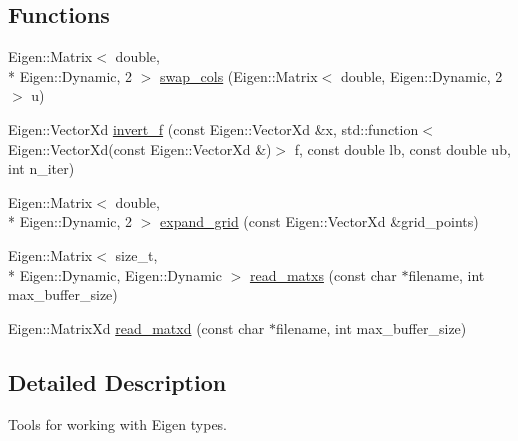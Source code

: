 \subsection*{Functions}
\begin{DoxyCompactItemize}
\item 
Eigen\+::\+Matrix$<$ double, \\*
Eigen\+::\+Dynamic, 2 $>$ \hyperlink{namespacevinecopulib_1_1tools__eigen_a87f5c90d47fb6baffc84ad28a82d8f0e}{swap\+\_\+cols} (Eigen\+::\+Matrix$<$ double, Eigen\+::\+Dynamic, 2 $>$ u)
\item 
Eigen\+::\+Vector\+Xd \hyperlink{namespacevinecopulib_1_1tools__eigen_a164995419e7e473fc4cec081ce4bcb85}{invert\+\_\+f} (const Eigen\+::\+Vector\+Xd \&x, std\+::function$<$ Eigen\+::\+Vector\+Xd(const Eigen\+::\+Vector\+Xd \&)$>$ f, const double lb, const double ub, int n\+\_\+iter)
\item 
Eigen\+::\+Matrix$<$ double, \\*
Eigen\+::\+Dynamic, 2 $>$ \hyperlink{namespacevinecopulib_1_1tools__eigen_a231dcb246ee7c996b822084e436a1c95}{expand\+\_\+grid} (const Eigen\+::\+Vector\+Xd \&grid\+\_\+points)
\item 
Eigen\+::\+Matrix$<$ size\+\_\+t, \\*
Eigen\+::\+Dynamic, Eigen\+::\+Dynamic $>$ \hyperlink{namespacevinecopulib_1_1tools__eigen_ac9f84f6a2e75bf8b559e5b0845abd782}{read\+\_\+matxs} (const char $\ast$filename, int max\+\_\+buffer\+\_\+size)
\item 
Eigen\+::\+Matrix\+Xd \hyperlink{namespacevinecopulib_1_1tools__eigen_adccba44df8156221d52f2d9ffbe321de}{read\+\_\+matxd} (const char $\ast$filename, int max\+\_\+buffer\+\_\+size)
\end{DoxyCompactItemize}


\subsection{Detailed Description}
Tools for working with Eigen types. 

